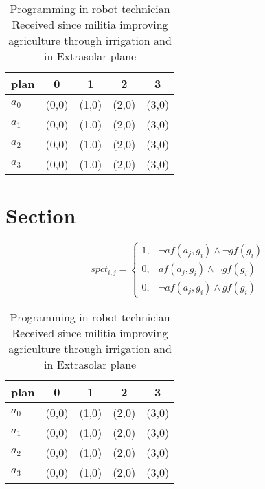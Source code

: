 \documentclass[a4paper]{article}
\begin{document}
\begin{table}
\begin{adjustbox}{width=0.7\columnwidth}
\begin{tabular}{|l|l|l|l|l|}
\hline
\textbf{plan} & \multicolumn{1}{c|}{\textbf{0}} & \multicolumn{1}{c|}{\textbf{1}} & \multicolumn{1}{c|}{\textbf{2}} & \multicolumn{1}{c|}{\textbf{3}} \\ \hline
\textbf{$a_0$}  & (0,0) & (1,0) & (2,0) & (3,0) \\ \hline
\textbf{$a_1$}  & (0,0) & (1,0) & (2,0) & (3,0) \\ \hline
\textbf{$a_2$}  & (0,0) & (1,0) & (2,0) & (3,0) \\ \hline
\textbf{$a_3$}  & (0,0) & (1,0) & (2,0) & (3,0) \\ \hline
\end{tabular}
\end{adjustbox}
\caption{Programming in robot technician Received since militia improving agriculture through irrigation and in Extrasolar plane
}
\end{table}

\section{Section}

\begin{equation}
spct_{i,j} =
\begin{cases}
1, & \text{$\neg af(a_j,g_i) \wedge \neg gf(g_i)$}\\
0, & \text{$af(a_j,g_i) \wedge \neg gf(g_i)$}\\
0, & \text{$\neg af(a_j,g_i) \wedge gf(g_i)$}
\end{cases}
\end{equation}

\begin{table}
\begin{adjustbox}{width=0.7\columnwidth}
\begin{tabular}{|l|l|l|l|l|}
\hline
\textbf{plan} & \multicolumn{1}{c|}{\textbf{0}} & \multicolumn{1}{c|}{\textbf{1}} & \multicolumn{1}{c|}{\textbf{2}} & \multicolumn{1}{c|}{\textbf{3}} \\ \hline
\textbf{$a_0$}  & (0,0) & (1,0) & (2,0) & (3,0) \\ \hline
\textbf{$a_1$}  & (0,0) & (1,0) & (2,0) & (3,0) \\ \hline
\textbf{$a_2$}  & (0,0) & (1,0) & (2,0) & (3,0) \\ \hline
\textbf{$a_3$}  & (0,0) & (1,0) & (2,0) & (3,0) \\ \hline
\end{tabular}
\end{adjustbox}
\caption{Programming in robot technician Received since militia improving agriculture through irrigation and in Extrasolar plane
}
\end{table}
\end{document}
